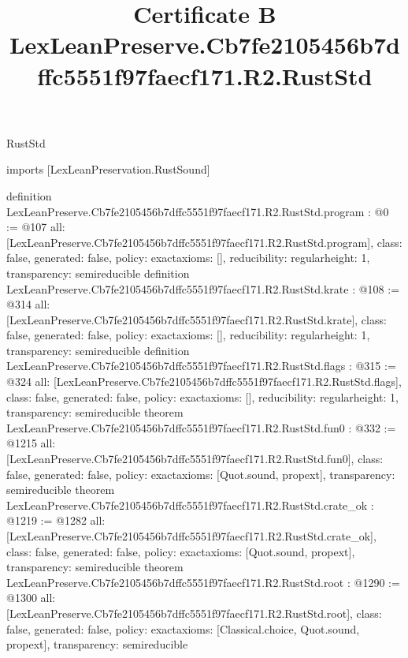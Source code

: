\begin{lexlean}{RustStd}
\title{Certificate B LexLeanPreserve.Cb7fe2105456b7dffc5551f97faecf171.R2.RustStd}
\begin{coremodule}
imports [LexLeanPreservation.RustSound]

definition LexLeanPreserve.Cb7fe2105456b7dffc5551f97faecf171.R2.RustStd.program : @0 := @107 {
  all: [LexLeanPreserve.Cb7fe2105456b7dffc5551f97faecf171.R2.RustStd.program],
  class: false,
  generated: false,
  policy: exact{axioms: []},
  reducibility: regular{height: 1},
  transparency: semireducible
}
definition LexLeanPreserve.Cb7fe2105456b7dffc5551f97faecf171.R2.RustStd.krate : @108 := @314 {
  all: [LexLeanPreserve.Cb7fe2105456b7dffc5551f97faecf171.R2.RustStd.krate],
  class: false,
  generated: false,
  policy: exact{axioms: []},
  reducibility: regular{height: 1},
  transparency: semireducible
}
definition LexLeanPreserve.Cb7fe2105456b7dffc5551f97faecf171.R2.RustStd.flags : @315 := @324 {
  all: [LexLeanPreserve.Cb7fe2105456b7dffc5551f97faecf171.R2.RustStd.flags],
  class: false,
  generated: false,
  policy: exact{axioms: []},
  reducibility: regular{height: 1},
  transparency: semireducible
}
theorem LexLeanPreserve.Cb7fe2105456b7dffc5551f97faecf171.R2.RustStd.fun0 : @332 := @1215 {
  all: [LexLeanPreserve.Cb7fe2105456b7dffc5551f97faecf171.R2.RustStd.fun0],
  class: false,
  generated: false,
  policy: exact{axioms: [Quot.sound, propext]},
  transparency: semireducible
}
theorem LexLeanPreserve.Cb7fe2105456b7dffc5551f97faecf171.R2.RustStd.crate_ok : @1219 := @1282 {
  all: [LexLeanPreserve.Cb7fe2105456b7dffc5551f97faecf171.R2.RustStd.crate_ok],
  class: false,
  generated: false,
  policy: exact{axioms: [Quot.sound, propext]},
  transparency: semireducible
}
theorem LexLeanPreserve.Cb7fe2105456b7dffc5551f97faecf171.R2.RustStd.root : @1290 := @1300 {
  all: [LexLeanPreserve.Cb7fe2105456b7dffc5551f97faecf171.R2.RustStd.root],
  class: false,
  generated: false,
  policy: exact{axioms: [Classical.choice, Quot.sound, propext]},
  transparency: semireducible
}


\end{coremodule}
\end{lexlean}
